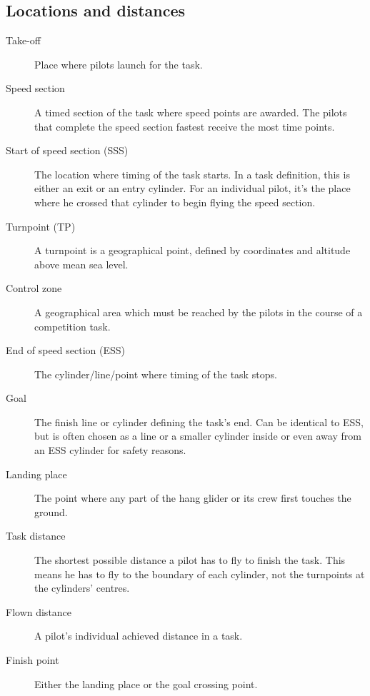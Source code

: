 \documentclass{article}
\begin{document}
\subsection{Locations and distances}
\begin{description}
    \item [Take-off]
        Place where pilots launch for the task.
    \item [Speed section]
        A timed section of the task where speed points are awarded. The pilots
        that complete the speed section fastest receive the most time points.
    \item [Start of speed section (SSS)]
        The location where timing of the task starts. In a task definition,
        this is either an exit or an entry cylinder. For an individual pilot,
        it’s the place where he crossed that cylinder to begin flying the speed
        section.
    \item [Turnpoint (TP)]
        A turnpoint is a geographical point, defined by coordinates and
        altitude above mean sea level.
    \item [Control zone]
        A geographical area which must be reached by the pilots in the course
        of a competition task.
    \item [End of speed section (ESS)]
        The cylinder/line/point where timing of the task stops.
    \item [Goal]
        The finish line or cylinder defining the task’s end. Can be identical
        to ESS, but is often chosen as a line or a smaller cylinder inside or
        even away from an ESS cylinder for safety reasons.
    \item [Landing place]
        The point where any part of the hang glider or its crew first touches
        the ground.
    \item [Task distance]
        The shortest possible distance a pilot has to fly to finish the task.
        This means he has to fly to the boundary of each cylinder, not the
        turnpoints at the cylinders’ centres.
    \item [Flown distance]
        A pilot’s individual achieved distance in a task.
    \item [Finish point]
        Either the landing place or the goal crossing point.
\end{description}
\end{document}
